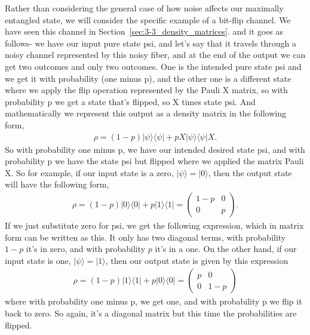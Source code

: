 Rather than considering the general case of how noise affects our maximally entangled state, we will consider the specific example of a bit-flip channel.
We have seen this channel in Section~\ref{sec:3-3_density_matrices}. and it goes as follows- we have our input pure state psi, and let's say that it travels through a noisy channel represented by this noisy fiber, and at the end of the output we can get two outcomes and only two outcomes. One is the intended pure state psi and we get it with probability (one minus p), and the other one is a different state where we apply the flip operation represented by the Pauli X matrix, so with probability p we get a state that's flipped, so X times state psi. And mathematically we represent this output as a density matrix in the following form,
\begin{align}
    \rho=(1-p)|\psi\rangle\langle\psi|+p X| \psi\rangle\langle\psi| X.
\end{align}
So with probability one minus p, we have our intended desired state psi, and with probability p we have the state psi but flipped where we applied the matrix Pauli X. So for example, if our input state is a zero, $|\psi\rangle=|0\rangle$,
then the output state will have the following form,
\begin{align}
    \rho=(1-p)|0\rangle\langle 0|+p| 1\rangle\langle 1|=\left(\begin{array}{cc}
1-p & 0 \\
0 & p
\end{array}\right).
\end{align}
If we just substitute zero for psi, we get the following expression, which in matrix form can be written as this. It only has two diagonal terms, with probability $1-p$ it's in zero, and with probability $p$ it's in a one. On the other hand, if our input state is one, $|\psi\rangle=|1\rangle$, then our output state is given by this expression
\begin{align}
    \rho=(1-p)|1\rangle\langle 1|+p| 0\rangle\langle 0|=\left(\begin{array}{cc}
p & 0 \\
0 & 1-p
\end{array}\right)
\end{align}
where with probability one minus p, we get one, and with probability p we flip it back to zero. So again, it's a diagonal matrix but this time the probabilities are flipped.

